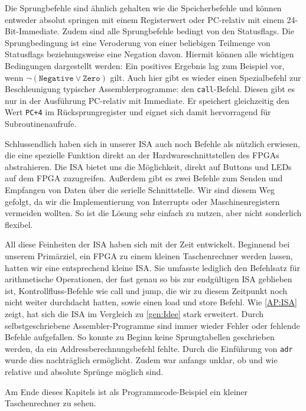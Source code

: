 Die Sprungbefehle sind ähnlich gehalten wie die Speicherbefehle und
können entweder absolut springen mit einem Registerwert oder PC-relativ mit einem 24-Bit-Immediate.
Zudem sind alle Sprungbefehle bedingt von den Statusflags.
Die Sprungbedingung ist eine Veroderung von einer beliebigen Teilmenge von Statusflags beziehungsweise eine Negation davon.
Hiermit können alle wichtigen Bedingungen dargestellt werden:
Ein positives Ergebnis lag zum Beispiel vor, wenn $\neg (\texttt{Negative} \lor \texttt{Zero})$ gilt.
Auch hier gibt es wieder einen Spezialbefehl zur Beschleunigung typischer Assemblerprogramme: den \texttt{call}-Befehl.
Diesen gibt es nur in der Ausführung PC-relativ mit Immediate.
Er speichert gleichzeitig den Wert \texttt{PC+4} im Rücksprungregister und
eignet sich damit hervorragend für Subroutinenaufrufe.

Schlussendlich haben sich in unserer ISA auch noch Befehle als nützlich erwiesen,
die eine spezielle Funktion direkt an der Hardwareschnittstellen des FPGAs abstrahieren.
Die ISA bietet uns die Möglichkeit, direkt auf Buttons und LEDs auf dem FPGA zuzugreifen.
Außerdem gibt es zwei Befehle zum Senden und Empfangen von Daten über die serielle Schnittstelle.
Wir sind diesem Weg gefolgt, da wir die Implementierung von Interrupts oder Maschinenregistern vermeiden wollten.
So ist die Lösung sehr einfach zu nutzen, aber nicht sonderlich flexibel.

All diese Feinheiten der ISA haben sich mit der Zeit entwickelt.
Beginnend bei unserem Primärziel, ein FPGA zu einem kleinen Taschenrechner werden lassen, hatten wir eine entsprechend kleine ISA.
Sie umfasste lediglich den Befehlsatz für arithmetische Operationen, der fast genau so bis zur endgültigen ISA geblieben ist,
Kontrollfluss-Befehle wie call und jump, die wir zu diesem Zeitpunkt noch nicht weiter durchdacht hatten, sowie einen load und store Befehl.
Wie \autoref{AP:ISA} zeigt, hat sich die ISA im Vergleich zu \autoref{gen:Idee} stark erweitert.
Durch selbstgeschriebene Assembler-Programme sind immer wieder Fehler oder fehlende Befehle aufgefallen.
So konnte zu Beginn keine Sprungtabellen geschrieben werden, da ein Addressberechnungsbefehl fehlte.
Durch die Einführung von \texttt{adr} wurde dies nachträglich ermöglicht.
Zudem war anfangs unklar, ob und wie relative und absolute Sprünge möglich sind.

Am Ende dieses Kapitels ist als Programmcode-Beispiel ein kleiner Taschenrechner zu sehen. 

